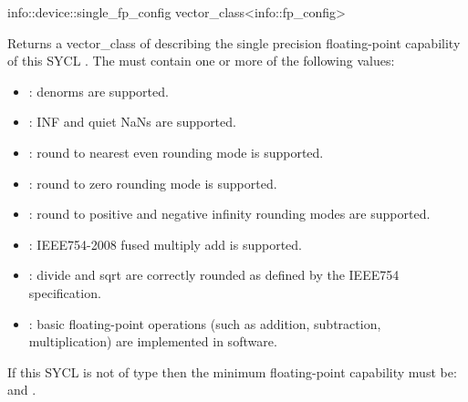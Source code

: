   \addInfoRow
  {info::device::single_fp_config}
  {vector_class<info::fp_config>}
  {
    Returns a vector_class of  describing the single precision floating-point capability of this SYCL . The  must contain one or more of the following values:
  \begin{itemize}
  \item {}: denorms are supported.
  \item {}: INF and quiet NaNs are
  supported.
  \item {}: round to
  nearest even rounding mode is supported.
  \item {}: round to zero
  rounding mode is supported.
  \item {}: round to positive
  and negative infinity rounding modes are supported.
  \item {}: IEEE754-2008 fused multiply add
  is supported.
  \item {}: divide and sqrt
        are correctly rounded as defined by the IEEE754 specification.
    \item {}: basic floating-point operations
        (such as addition, subtraction, multiplication) are implemented in software.
   \end{itemize}
    If this SYCL  is not of type  then the minimum floating-point capability must be:
     and .
  }


